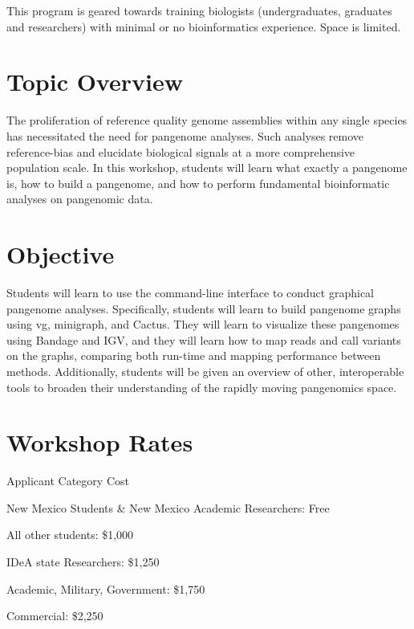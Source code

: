 \documentclass[
]{book}
\begin{document}
This program is geared towards training biologists (undergraduates, graduates and researchers) with minimal or no bioinformatics experience. Space is limited.

\hypertarget{topic-overview}{%
\section*{Topic Overview}\label{topic-overview}}

The proliferation of reference quality genome assemblies within any single species has necessitated the need for pangenome analyses. Such analyses remove reference-bias and elucidate biological signals at a more comprehensive population scale. In this workshop, students will learn what exactly a pangenome is, how to build a pangenome, and how to perform fundamental bioinformatic analyses on pangenomic data.

\hypertarget{objective-1}{%
\section*{Objective}\label{objective-1}}

Students will learn to use the command-line interface to conduct graphical pangenome analyses. Specifically, students will learn to build pangenome graphs using vg, minigraph, and Cactus. They will learn to visualize these pangenomes using Bandage and IGV, and they will learn how to map reads and call variants on the graphs, comparing both run-time and mapping performance between methods. Additionally, students will be given an overview of other, interoperable tools to broaden their understanding of the rapidly moving pangenomics space.

\hypertarget{workshop-rates-1}{%
\section*{Workshop Rates}\label{workshop-rates-1}}

Applicant Category Cost

New Mexico Students \& New Mexico Academic Researchers:
Free

All other students:
\$1,000

IDeA state Researchers:
\$1,250

Academic, Military, Government:
\$1,750

Commercial:
\$2,250
\end{document}
